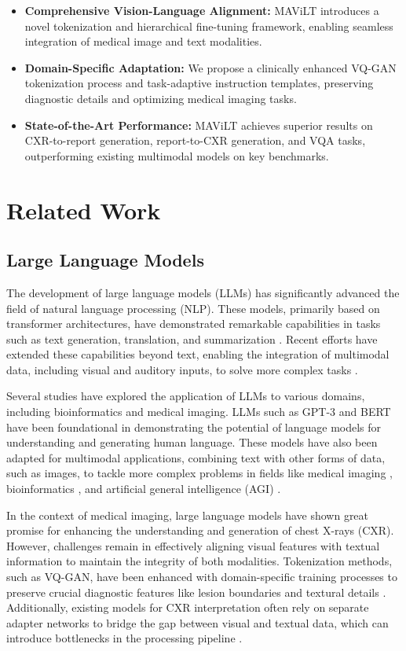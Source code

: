 \begin{itemize}
    \item \textbf{Comprehensive Vision-Language Alignment:} MAViLT introduces a novel tokenization and hierarchical fine-tuning framework, enabling seamless integration of medical image and text modalities.
    \item \textbf{Domain-Specific Adaptation:} We propose a clinically enhanced VQ-GAN tokenization process and task-adaptive instruction templates, preserving diagnostic details and optimizing medical imaging tasks.
    \item \textbf{State-of-the-Art Performance:} MAViLT achieves superior results on CXR-to-report generation, report-to-CXR generation, and VQA tasks, outperforming existing multimodal models on key benchmarks.
\end{itemize}



\section{Related Work}
\subsection{Large Language Models}
The development of large language models (LLMs) has significantly advanced the field of natural language processing (NLP). These models, primarily based on transformer architectures, have demonstrated remarkable capabilities in tasks such as text generation, translation, and summarization \cite{zhou2023style,zhou2021improving,zhou2021modeling}. Recent efforts have extended these capabilities beyond text, enabling the integration of multimodal data, including visual and auditory inputs, to solve more complex tasks \cite{zhou2023improving}.

Several studies have explored the application of LLMs to various domains, including bioinformatics and medical imaging. LLMs such as GPT-3 and BERT have been foundational in demonstrating the potential of language models for understanding and generating human language. These models have also been adapted for multimodal applications, combining text with other forms of data, such as images, to tackle more complex problems in fields like medical imaging \cite{ratzlaff2024training}, bioinformatics \cite{garg2023multimodal}, and artificial general intelligence (AGI) \cite{xu2024introspection,zhou2024visual}.

In the context of medical imaging, large language models have shown great promise for enhancing the understanding and generation of chest X-rays (CXR). However, challenges remain in effectively aligning visual features with textual information to maintain the integrity of both modalities. Tokenization methods, such as VQ-GAN, have been enhanced with domain-specific training processes to preserve crucial diagnostic features like lesion boundaries and textural details \cite{bucciarelli2024personalizing}. Additionally, existing models for CXR interpretation often rely on separate adapter networks to bridge the gap between visual and textual data, which can introduce bottlenecks in the processing pipeline \cite{xu2024introspection}.

